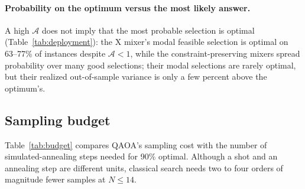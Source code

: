 \documentclass[11pt]{article}
\newcommand{\Amp}{\mathcal{A}}
\begin{document}
\paragraph{Probability on the optimum versus the most likely answer.} A high $\Amp$ does not imply
that the most probable selection is optimal (Table~\ref{tab:deployment}): the X mixer's modal
feasible selection is optimal on 63--77\% of instances despite $\Amp<1$, while the
constraint-preserving mixers spread probability over many good selections; their modal selections
are rarely optimal, but their realized out-of-sample variance is only a few percent above the
optimum's.
\begin{table}[ht]\centering\small
\caption{Modal feasible selection: share optimal / median ratio of its realized 2021--2023 variance
to the optimum's (sample covariance).}
\label{tab:deployment}

\end{table}

\subsection{Sampling budget}
Table~\ref{tab:budget} compares QAOA's sampling cost with the number of simulated-annealing steps
needed for 90\% optimal. Although a shot and an annealing step are different units, classical
search needs two to four orders of magnitude fewer samples at $N\le14$.
\begin{table}[ht]\centering\small
\caption{Median QAOA shots per run (optimization plus ADAPT operator selection) versus the smallest
simulated-annealing budget that is optimal on $\geq90\%$ of instances.}
\label{tab:budget}

\end{table}
\end{document}
